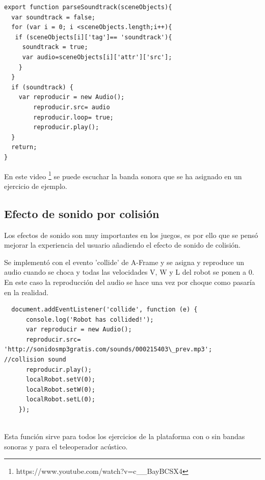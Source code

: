\begin{lstlisting}
export function parseSoundtrack(sceneObjects){
  var soundtrack = false;
  for (var i = 0; i <sceneObjects.length;i++){
   if (sceneObjects[i]['tag']== 'soundtrack'){
     soundtrack = true;
     var audio=sceneObjects[i]['attr']['src'];
    }
  }
  if (soundtrack) {
    var reproducir = new Audio();
        reproducir.src= audio
        reproducir.loop= true;
        reproducir.play();
  }
  return;
}
\end{lstlisting}

En este video \footnote{https://www.youtube.com/watch?v=c\_\_BayBCSX4} se puede escuchar la banda sonora que se ha asignado en un ejercicio de ejemplo.

\subsection{Efecto de sonido por colisión }

Los efectos de sonido son muy importantes en los juegos, es por ello que se pensó mejorar la experiencia del usuario añadiendo el efecto de sonido de colisión. 

Se implementó con el evento 'collide' de A-Frame y se asigna y reproduce un audio cuando se choca y todas las velocidades V, W y L del robot se ponen a 0.  En este caso la reproducción del audio se hace una vez por choque como pasaría en la realidad.

\begin{lstlisting}
  document.addEventListener('collide', function (e) {
      console.log('Robot has collided!');
      var reproducir = new Audio();
      reproducir.src= 'http://sonidosmp3gratis.com/sounds/000215403\_prev.mp3';   //collision sound
      reproducir.play();
      localRobot.setV(0);
      localRobot.setW(0);
      localRobot.setL(0);
	});
	
\end{lstlisting}

Esta función sirve para todos los ejercicios de la plataforma con o sin  bandas sonoras y para el teleoperador acústico.